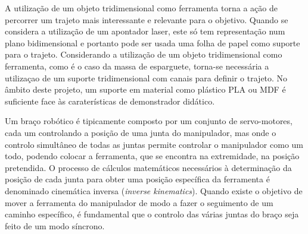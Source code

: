 A utilização de um objeto tridimensional como ferramenta torna a ação de
percorrer um trajeto mais interessante e relevante para o objetivo.
Quando se considera a utilização de um apontador laser, este só tem
representação num plano bidimensional e portanto pode ser usada uma folha
de papel como suporte para o trajeto. Considerando a utilização de um
objeto tridimensional como ferramenta, como é o caso da massa de
esparguete, torna-se necessária a utilizaçao de um suporte tridimensional
com canais para definir o trajeto. No âmbito deste projeto, um suporte
em material como plástico PLA ou MDF é suficiente face às caraterísticas
de demonstrador didático.

Um braço robótico é tipicamente composto por um conjunto de servo-motores,
cada um controlando a posição de uma junta do manipulador, mas onde o
controlo simultâneo de todas as juntas permite controlar o manipulador
como um todo, podendo colocar a ferramenta, que se encontra na extremidade,
na posição pretendida. O processo de cálculos matemáticos necessários à
determinação da posição de cada junta para obter uma posição específica da
ferramenta é denominado cinemática inversa (\emph{inverse kinematics}).
Quando existe o objetivo de mover a ferramenta do manipulador de modo a
fazer o seguimento de um caminho específico, é fundamental que o controlo
das várias juntas do braço seja feito de um modo síncrono.




